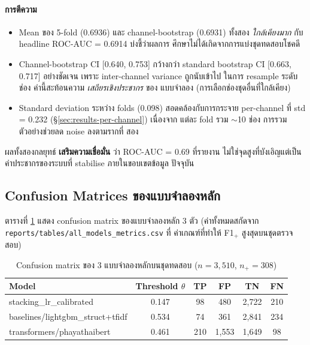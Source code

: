 \paragraph{การตีความ}
\begin{itemize}[leftmargin=2em]
  \item Mean ของ 5-fold (0.6936) และ channel-bootstrap (0.6931) ทั้งสอง
        \emph{ใกล้เคียงมาก} กับ headline ROC-AUC = 0.6914 บ่งชี้ว่าผลการ
        ศึกษาไม่ได้เกิดจากการแบ่งชุดทดสอบโชคดี
  \item Channel-bootstrap CI [0.640, 0.753] กว้างกว่า standard bootstrap CI
        [0.663, 0.717] อย่างชัดเจน เพราะ inter-channel variance ถูกนับเข้าไป
        ในการ resample ระดับช่อง ค่านี้สะท้อนความ \emph{เสถียรเชิงประชากร} ของ
        แบบจำลอง (การเลือกช่องชุดอื่นที่ใกล้เคียง)
  \item Standard deviation ระหว่าง folds (0.098) สอดคล้องกับการกระจาย
        per-channel ที่ std = 0.232 (\S\ref{sec:results-per-channel}) เนื่องจาก
        แต่ละ fold รวม $\sim$10 ช่อง การรวมตัวอย่างช่วยลด noise ลงตามรากที่
        สอง
\end{itemize}

ผลทั้งสองกลยุทธ์ \textbf{เสริมความเชื่อมั่น} ว่า ROC-AUC = 0.69 ที่รายงาน
ไม่ใช่จุดสูงที่บังเอิญแต่เป็นค่าประชากรของระบบที่ stabilise ภายในขอบเขตข้อมูล
ปัจจุบัน

\subsection{Confusion Matrices ของแบบจำลองหลัก}

ตารางที่ \ref{tab:confusion} แสดง confusion matrix ของแบบจำลองหลัก 3 ตัว
(ค่าทั้งหมดสกัดจาก \texttt{reports/tables/all\_models\_metrics.csv} ที่
ค่าเกณฑ์ที่ทำให้ F1$_{+}$ สูงสุดบนชุดตรวจสอบ)

\begin{table}[H]
\centering
\caption{Confusion matrix ของ 3 แบบจำลองหลักบนชุดทดสอบ ($n = 3{,}510$,
$n_{+} = 308$)}
\label{tab:confusion}
\small
\begin{tabular}{l|c|cc|cc}
\toprule
\textbf{Model} & \textbf{Threshold $\theta$} & \textbf{TP} & \textbf{FP} & \textbf{TN} & \textbf{FN} \\
\midrule
stacking\_lr\_calibrated      & 0.147 & 98  & 480  & 2{,}722 & 210 \\
baselines/lightgbm\_struct+tfidf & 0.534 & 74  & 361  & 2{,}841 & 234 \\
transformers/phayathaibert    & 0.461 & 210 & 1{,}553 & 1{,}649 & 98  \\
\bottomrule
\end{tabular}
\end{table}

